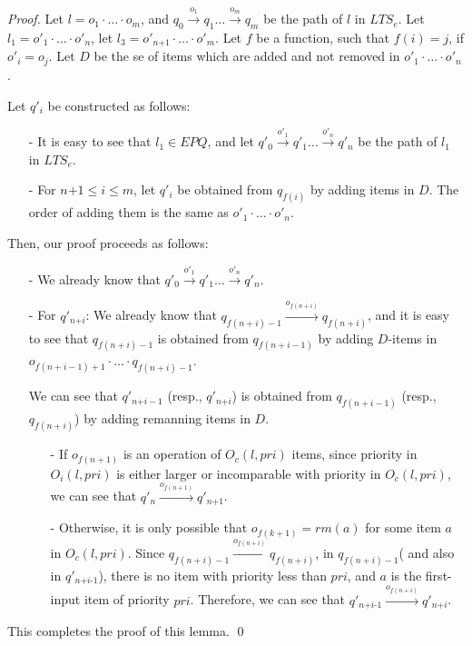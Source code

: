 \begin {proof}
Let $l=o_1 \cdot \ldots \cdot o_m$, and $q_0 \xrightarrow{o_1} q_1 \ldots \xrightarrow{o_m} q_m$ be the path of $l$ in $\textit{LTS}_e$. Let $l_1 = o'_1 \cdot \ldots \cdot o'_n$, let $l_3 = o'_{\textit{n+1}} \cdot \ldots \cdot o'_m$. Let $f$ be a function, such that $f(i)=j$, if $o'_i = o_j$. Let $D$ be the se of items which are added and not removed in $o'_1 \cdot \ldots \cdot o'_n$.

Let $q'_i$ be constructed as follows:

\begin{itemize}
\setlength{\itemsep}{0.5pt}
\item[-] It is easy to see that $l_1 \in \textit{EPQ}$, and let $q'_0 \xrightarrow{o'_1} q'_1 \ldots \xrightarrow{o'_n} q'_n$ be the path of $l_1$ in $\textit{LTS}_e$.

\item[-] For $\textit{n+1} \leq i \leq m$, let $q'_i$ be obtained from $q_{f(i)}$ by adding items in $D$. The order of adding them is the same as $o'_1 \cdot \ldots \cdot o'_n$.
\end{itemize}

Then, our proof proceeds as follows:

\begin{itemize}
\setlength{\itemsep}{0.5pt}
\item[-] We already know that $q'_0 \xrightarrow{o'_1} q'_1 \ldots \xrightarrow{o'_n} q'_n$.

\item[-] For $q'_{\textit{n+i}}$: We already know that $q_{f(n+i)-1} \xrightarrow{o_{f(n+i)}} q_{f(n+i)}$, and it is easy to see that $q_{f(n+i)-1}$ is obtained from $q_{f(n+i-1)}$ by adding $D$-items in $o_{f(n+i-1)+1} \cdot \ldots \cdot q_{f(n+i)-1}$.

     We can see that $q'_{\textit{n+i}-1}$ (resp., $q'_{\textit{n+i}}$) is obtained from $q_{f(n+i-1)}$ (resp., $q_{f(n+i)}$) by adding remanning items in $D$.

    \begin{itemize}
    \setlength{\itemsep}{0.5pt}
    \item[-] If $o_{f(n+1)}$ is an operation of $O_c(l,\textit{pri})$ items, since priority in $O_i(l,\textit{pri})$ is either larger or incomparable with priority in $O_c(l,\textit{pri})$, we can see that $q'_n \xrightarrow{o_{f(n+1)}} q'_{\textit{n+1}}$.

    \item[-] Otherwise, it is only possible that $o_{f(k+1)} = \textit{rm}(a)$ for some item $a$ in $O_c(l,\textit{pri})$. Since $q_{f(n+i)-1} \xrightarrow{o_{f(n+i)}} q_{f(n+i)}$, in $q_{f(n+i)-1}$( and also in $q'_{\textit{n+i-1}}$), there is no item with priority less than $\textit{pri}$, and $a$ is the first-input item of priority $\textit{pri}$. Therefore, we can see that $q'_{\textit{n+i-1}} \xrightarrow{o_{f(n+i)}} q'_{\textit{n+i}}$.
    \end{itemize}
\end{itemize}

This completes the proof of this lemma. \qed
\end {proof}

